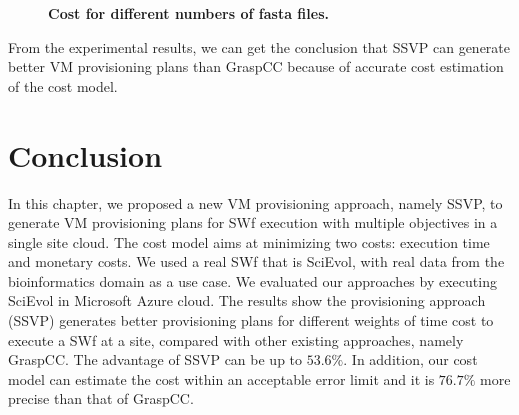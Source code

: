 \begin{figure}[htbp]
\begin{centering}
\caption{\textbf{Cost for different numbers of fasta files.}}\label{fig:pcomparisionD}
\end{centering}
\end{figure}
From the experimental results, we can get the conclusion that SSVP can generate better VM provisioning plans than GraspCC because of accurate cost estimation of the cost model. 

\section{Conclusion}
\label{sec:PCon}

In this chapter, we proposed a new VM provisioning approach, namely SSVP, to generate VM provisioning plans for SWf execution with multiple objectives in a single site cloud. The cost model aims at minimizing two costs: execution time and monetary costs.
We used a real SWf that is SciEvol, with real data from the bioinformatics domain as a use case. We evaluated our approaches by executing SciEvol in Microsoft Azure cloud. The results show the provisioning approach (SSVP) generates better provisioning plans for different weights of time cost to execute a SWf at a site, compared with other existing approaches, namely GraspCC. The advantage of SSVP can be up to $53.6\%$. In addition, our cost model can estimate the cost within an acceptable error limit and it is $76.7\%$ more precise than that of GraspCC.